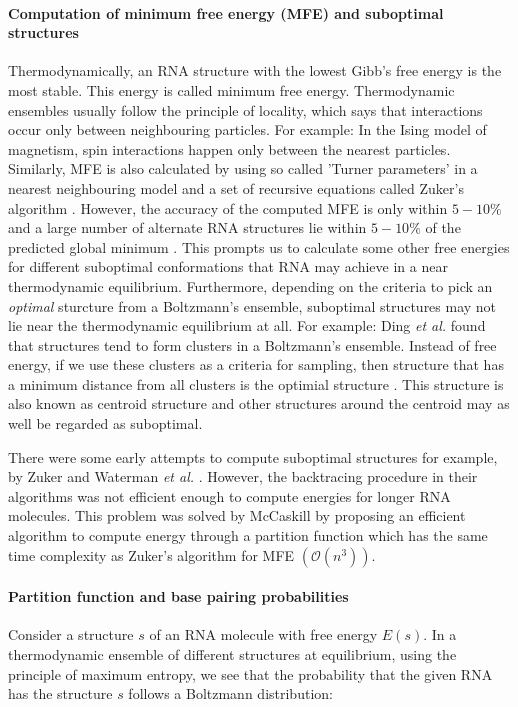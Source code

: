 \paragraph{Computation of minimum free energy (MFE) and suboptimal structures}
Thermodynamically, an RNA structure with the lowest Gibb's free energy is the most stable. This energy is called minimum free energy. Thermodynamic ensembles usually follow the principle of locality, which says that interactions occur only between neighbouring particles. For example: In the Ising model of magnetism, spin interactions happen only between the nearest particles. Similarly, MFE is also calculated by using so called 'Turner parameters' \cite{turner2009nndb} in a nearest neighbouring model and a set of recursive equations called Zuker's algorithm \cite{zuker1981optimal}. However, the accuracy of the computed MFE is only within $5-10\%$ and a large number of alternate RNA structures lie within $5-10\%$ of the predicted global minimum \cite{eddy2004rna}. This prompts us to calculate some other free energies for different suboptimal conformations that RNA may achieve in a near thermodynamic equilibrium. Furthermore, depending on the criteria to pick an \textit{optimal} sturcture from a Boltzmann's ensemble, suboptimal structures may not lie near the thermodynamic equilibrium at all. For example: Ding \textit{et al.} \cite{ding2005rna}  found that structures tend to form clusters in a Boltzmann's ensemble. Instead of free energy, if we use these clusters as a criteria for sampling, then structure that has a minimum distance from all clusters is the optimial structure \cite{lorenz2016predicting}. This structure is also known as centroid structure and other structures around the centroid may as well be regarded as suboptimal.



There were some early attempts to compute suboptimal structures for example, by Zuker \cite{zuker1989finding} and Waterman \textit{et al.} \cite{waterman1985dynamic}. However, the backtracing procedure in their algorithms was not efficient enough to compute energies for longer RNA molecules. This problem was solved by McCaskill \cite{mccaskill1990equilibrium} by proposing an efficient algorithm to compute energy through a partition function which has the same time complexity as Zuker's algorithm for MFE $(\mathcal{O}(n^{3}))$.

\paragraph{Partition function and base pairing probabilities}
Consider a structure $s$ of an RNA molecule with free energy $E(s)$. In a thermodynamic ensemble of different structures at equilibrium, using the principle of maximum entropy, we see that the probability that the given RNA has the structure $s$ follows a Boltzmann distribution:

